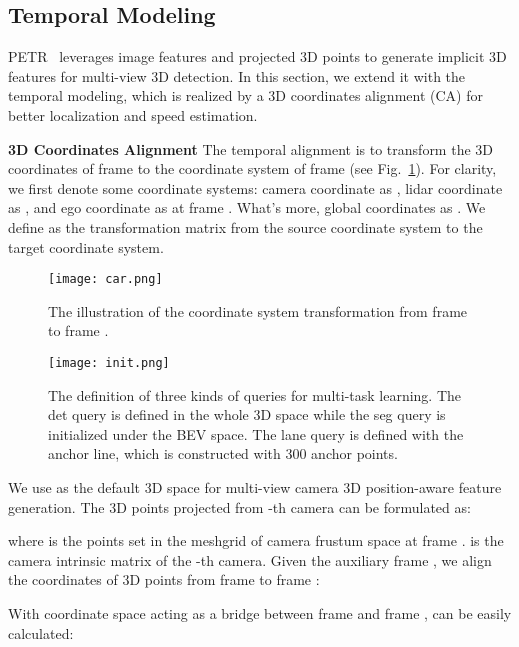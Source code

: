 \documentclass[10pt,twocolumn,letterpaper]{article}
\begin{document}
\subsection{Temporal Modeling}



PETR~\cite{liu2022petr} leverages image features and projected 3D points to generate implicit 3D features for multi-view 3D detection. In this section, we extend it with the temporal modeling, which is realized by a 3D coordinates alignment (CA) for better localization and speed estimation. 

\noindent \textbf{3D Coordinates Alignment} 
The temporal alignment is to transform the 3D coordinates of frame  to the coordinate system of frame  (see Fig.~\ref{coordinate}). For clarity, we first denote some coordinate systems: camera coordinate as , lidar coordinate as  , and ego coordinate as  at frame . What's more, global coordinates as .
We define  as the transformation matrix from the source coordinate system to the target coordinate system.

\begin{figure}[h]
	\centering  
	\texttt{[image: car.png]}
	\caption{The illustration of the coordinate system transformation from frame  to frame .
    }  
	\label{coordinate}
\end{figure}

\begin{figure*}[t]
	\centering  
	\texttt{[image: init.png]}
    \vspace{-10pt}
	\caption{
	 The definition of three kinds of queries for multi-task learning. The det query is defined in the whole 3D space while the seg query is initialized under the BEV space. The lane query is defined with the anchor line, which is constructed with 300 anchor points.  
    }  
	\label{seg}
\end{figure*}

We use  as the default 3D space for multi-view camera 3D position-aware feature generation. The 3D points  projected from -th camera can be formulated as:

where  is the points set in the meshgrid of camera frustum space at frame .  is the camera intrinsic matrix of the -th camera.
Given the auxiliary frame , we align the coordinates of 3D points from frame  to frame :

With  coordinate space acting as a bridge between frame  and frame ,  can be easily calculated:
\end{document}
